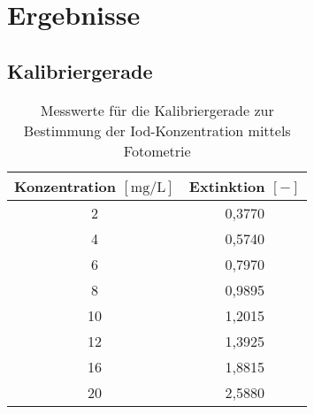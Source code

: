 \newpage
\section{Ergebnisse}
\label{sec:ergebnisse}

\subsection*{Kalibriergerade}
\begin{table}[h!]
	\renewcommand*{\arraystretch}{1.2}
	\centering
	\caption{Messwerte für die Kalibriergerade zur Bestimmung der Iod-Konzentration mittels Fotometrie}
	\label{tab:kalibirerung}
		\begin{tabulary}{1.0\textwidth}{C|C}
			\hline
			\textbf{Konzentration $\left[\si{\milli \gram \per \liter}\right]$} & \textbf{Extinktion $\left[-\right]$}\\
			\hline
			  2     & 0,3770 \\
			 4     & 0,5740 \\
			 6     & 0,7970 \\
			 8     & 0,9895 \\
			 10    & 1,2015 \\
			 12    & 1,3925 \\
			\hline
			 16    & 1,8815 \\
			 20    & 2,5880 \\
			\hline			
	\end{tabulary}
\end{table}%
\FloatBarrier

